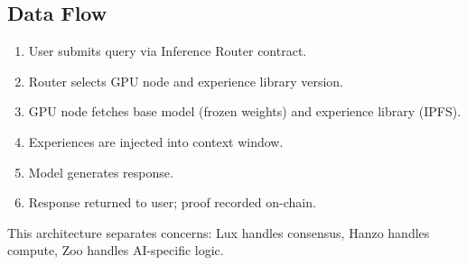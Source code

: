 \subsection{Data Flow}

\begin{enumerate}
\item User submits query via Inference Router contract.
\item Router selects GPU node and experience library version.
\item GPU node fetches base model (frozen weights) and experience library (IPFS).
\item Experiences are injected into context window.
\item Model generates response.
\item Response returned to user; proof recorded on-chain.
\end{enumerate}

This architecture separates concerns: Lux handles consensus, Hanzo handles compute, Zoo handles AI-specific logic.

